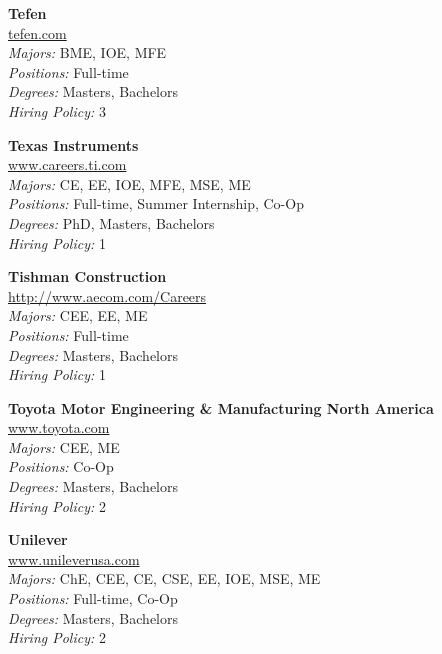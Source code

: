 \documentclass[twoside]{article}
\begin{document}
\begin{center}
\begin{multicols}{3}
\begin{minipage}{.9\columnwidth}{\Large\bf Tefen }\\
	\url{tefen.com}\\
	\emph{Majors:} BME, IOE, MFE\\
	\emph{Positions:} Full-time\\
	\emph{Degrees:} Masters, Bachelors\\
	\emph{Hiring Policy:} 3\\
\end{minipage}
 
\begin{minipage}{.9\columnwidth}{\Large\bf Texas Instruments }\\
	\url{www.careers.ti.com}\\
	\emph{Majors:} CE, EE, IOE, MFE, MSE, ME\\
	\emph{Positions:} Full-time, Summer Internship, Co-Op\\
	\emph{Degrees:} PhD, Masters, Bachelors\\
	\emph{Hiring Policy:} 1\\
\end{minipage}
 
\begin{minipage}{.9\columnwidth}{\Large\bf Tishman Construction }\\
	\url{http://www.aecom.com/Careers}\\
	\emph{Majors:} CEE, EE, ME\\
	\emph{Positions:} Full-time\\
	\emph{Degrees:} Masters, Bachelors\\
	\emph{Hiring Policy:} 1\\
\end{minipage}
 
\begin{minipage}{.9\columnwidth}{\Large\bf Toyota Motor Engineering \& Manufacturing North America }\\
	\url{www.toyota.com}\\
	\emph{Majors:} CEE, ME\\
	\emph{Positions:} Co-Op\\
	\emph{Degrees:} Masters, Bachelors\\
	\emph{Hiring Policy:} 2\\
\end{minipage}
 
\begin{minipage}{.9\columnwidth}{\Large\bf Unilever }\\
	\url{www.unileverusa.com}\\
	\emph{Majors:} ChE, CEE, CE, CSE, EE, IOE, MSE, ME\\
	\emph{Positions:} Full-time, Co-Op\\
	\emph{Degrees:} Masters, Bachelors\\
	\emph{Hiring Policy:} 2\\
\end{minipage}
 

\end{multicols}
\end{center}
\end{document}
